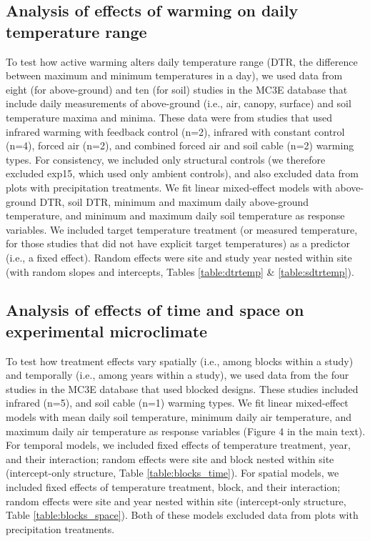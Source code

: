 \documentclass{article}
\begin{document}
\subsection* {Analysis of effects of warming on daily temperature range}
To test how active warming alters daily temperature range (DTR, the difference between maximum and minimum temperatures in a day), we used data from eight (for above-ground) and ten (for soil) studies in the MC3E database that include daily measurements of above-ground (i.e., air, canopy, surface) and soil temperature maxima and minima. These data were from studies that used infrared warming with feedback control (n=2), infrared with constant control (n=4), forced air (n=2), and combined forced air and soil cable (n=2) warming types.  For consistency, we included only structural controls (we therefore excluded exp15, which used only ambient controls), and also excluded data from plots with precipitation treatments. We fit linear mixed-effect models with above-ground DTR, soil DTR, minimum and maximum daily above-ground temperature, and minimum and maximum daily soil temperature as response variables. We included target temperature treatment (or measured temperature, for those studies that did not have explicit target temperatures) as a predictor (i.e., a fixed effect). Random effects were site and study year nested within site (with random slopes and intercepts, Tables \ref{table:dtrtemp} \& \ref{table:sdtrtemp}). 

\subsection* {Analysis of effects of time and space on experimental microclimate}
To test how treatment effects vary spatially (i.e., among blocks within a study) and temporally (i.e., among years within a study), we used data from the four studies in the MC3E database that used blocked designs. These studies included infrared (n=5), and soil cable (n=1) warming types.  We fit linear mixed-effect models with mean daily soil temperature, minimum daily air temperature, and maximum daily air temperature as response variables (Figure 4 in the main text). For temporal models, we included fixed effects of temperature treatment, year, and their interaction; random effects were site and block nested within site (intercept-only structure, Table \ref{table:blocks_time}). For spatial models, we included fixed effects of temperature treatment, block, and their interaction; random effects were site and year nested within site (intercept-only structure, Table \ref{table:blocks_space}). Both of these models excluded data from plots with precipitation treatments. 
\end{document}
